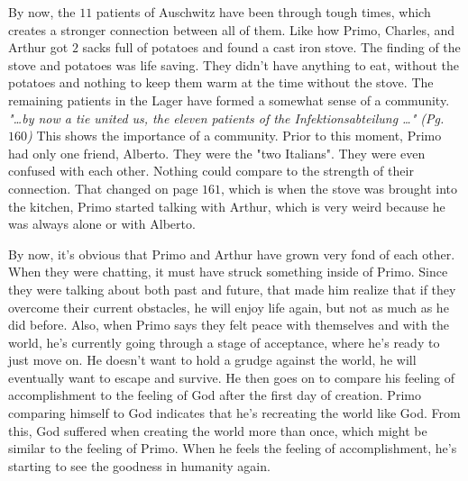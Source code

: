 By now, the $11$ patients of Auschwitz have been through tough times, which
creates a stronger connection between all of them. Like how Primo, Charles, and
Arthur got $2$ sacks full of potatoes and found a cast iron stove. The finding
of the stove and potatoes was life saving. They didn't have anything to eat,
without the potatoes and nothing to keep them warm at the time without the
stove. The remaining patients in the Lager have formed a somewhat sense of a
community. \textit{"\ldots by now a tie united us, the eleven patients of the
Infektionsabteilung \ldots" (Pg. $160$)} This shows the importance of a
community. Prior to this moment, Primo had only one friend, Alberto. They were
the "two Italians". They were even confused with each other. Nothing could
compare to the strength of their connection. That changed on page $161$, which
is when the stove was brought into the kitchen, Primo started talking with
Arthur, which is very weird because he was always alone or with Alberto.

\begin{center}
\end{center}

By now, it's obvious that Primo and Arthur have grown very fond of each other.
When they were chatting, it must have struck something inside of Primo. Since
they were talking about both past and future, that made him realize that if
they overcome their current obstacles, he will enjoy life again, but not as
much as he did before. Also, when Primo says they felt peace with themselves
and with the world, he's currently going through a stage of acceptance, where
he's ready to just move on. He doesn't want to hold a grudge against the world,
he will eventually want to escape and survive. He then goes on to compare his
feeling of accomplishment to the feeling of God after the first day of
creation. Primo comparing himself to God indicates that he's recreating the
world like God. From this, God suffered when creating the world more than once,
which might be similar to the feeling of Primo. When he feels the feeling of
accomplishment, he's starting to see the goodness in humanity again.

